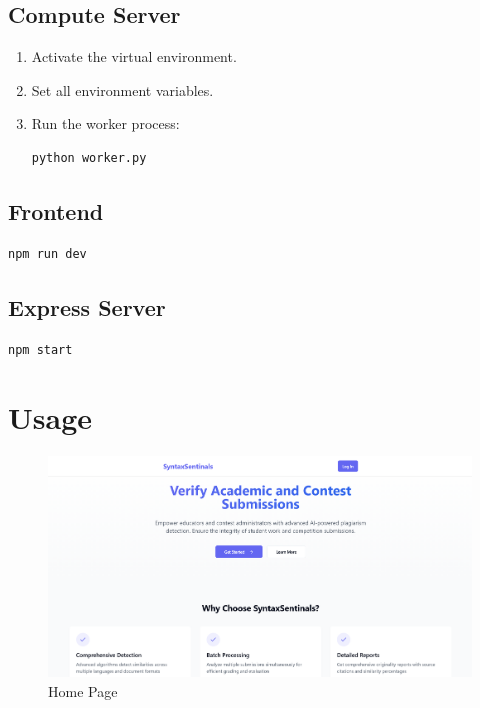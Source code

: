 \documentclass{article}
\begin{document}
\subsection{Compute Server}
\begin{enumerate}
    \item Activate the virtual environment.
    \item Set all environment variables.
    \item Run the worker process:
\begin{Verbatim}[fontsize=\small]
python worker.py
\end{Verbatim}
\end{enumerate}

\subsection{Frontend}
\begin{Verbatim}[fontsize=\small]
npm run dev
\end{Verbatim}

\subsection{Express Server}
\begin{Verbatim}[fontsize=\small]
npm start
\end{Verbatim}

\section{Usage}


\begin{figure}[H]
    \centering
    \includegraphics[width=\textwidth]{HomePage.png}
    \caption{Home Page}
    \label{fig:home}
  \end{figure}
\end{document}
